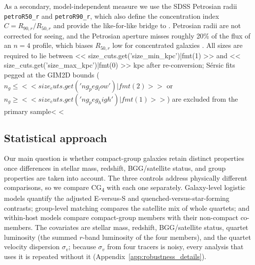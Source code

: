 \documentclass{aa}
\newcommand{\CG}{CG\textsubscript{4}}
\begin{document}
As a secondary, model-independent measure we use the SDSS Petrosian radii \texttt{petroR50\_r} and \texttt{petroR90\_r}, which also define the concentration index \(C = R_{90,r}/R_{50,r}\) and provide the like-for-like bridge to \citet{Coenda+12}. Petrosian radii are not corrected for seeing, and the Petrosian aperture misses roughly 20\% of the flux of an \(n=4\) profile, which biases \(R_{50,r}\) low for concentrated galaxies \citep{Blanton2001,Graham2005}. All sizes are required to lie between << size_cuts.get('size_min_kpc')|fmt(1) >> and << size_cuts.get('size_max_kpc')|fmt(0) >> kpc after re-conversion; S\'ersic fits pegged at the GIM2D bounds (\(n_g \le << size_cuts.get('ng_peg_low')|fmt(2) >>\) or \(n_g \ge << size_cuts.get('ng_peg_high')|fmt(1) >>\)) are excluded from the primary sample<%
<%

\subsection{Statistical approach}\label{sec:stats}

Our main question is whether compact-group galaxies retain distinct properties once differences in stellar mass, redshift, BGG/satellite status, and group properties are taken into account. The three controls address physically different comparisons, so we compare \CG{} with each one separately. Galaxy-level logistic models quantify the adjusted E-versus-S and quenched-versus-star-forming contrasts; group-level matching compares the satellite mix of whole quartets; and within-host models compare compact-group members with their non-compact co-members. The covariates are stellar mass, redshift, BGG/satellite status, quartet luminosity (the summed \(r\)-band luminosity of the four members), and the quartet velocity dispersion \(\sigma_v\); because \(\sigma_v\) from four tracers is noisy, every analysis that uses it is repeated without it (Appendix~\ref{app:robustness_details}).
\end{document}
